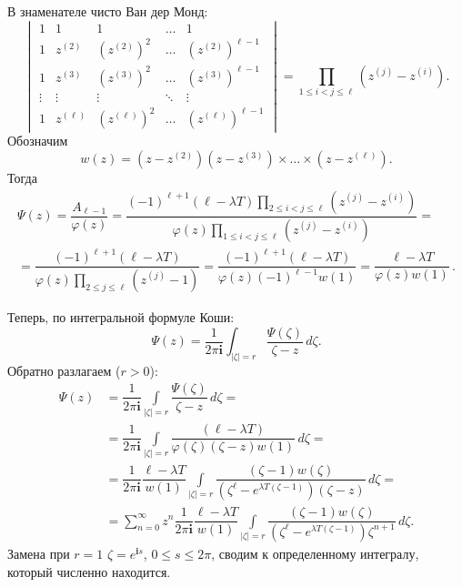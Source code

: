 \documentclass[10pt,oneside,final]{book}
\begin{document}
В знаменателе чисто Ван дер Монд:
\[
  \begin{vmatrix}
    1 & 1 & 1 & \ldots & 1 \\
    1 & z^{(2)} & (z^{(2)})^2 & \ldots & (z^{(2)})^{\ell-1}\\
    1 & z^{(3)} & (z^{(3)})^2 & \ldots & (z^{(3)})^{\ell-1}\\
    \vdots & \vdots & \vdots & \ddots & \vdots\\
    1 & z^{(\ell)} & (z^{(\ell)})^2 & \ldots & (z^{(\ell)})^{\ell-1}
  \end{vmatrix}=
  \prod_{1\leqslant i<j\leqslant \ell} (z^{(j)}-z^{(i)}).
\]
Обозначим 
\[
w(z)=(z-z^{(2)})(z-z^{(3)})\times\ldots\times (z-z^{(\ell)}).
\]
Тогда
\begin{multline*}
\Psi(z)=\dfrac{A_{\ell-1}}{\varphi(z)}=
\dfrac{(-1)^{\ell+1}(\ell-\lambda T) \prod\limits_{2\leqslant i<j\leqslant \ell}
  (z^{(j)}-z^{(i)})}{\varphi(z)\prod\limits_{1\leqslant i<j\leqslant \ell} (z^{(j)}-z^{(i)})}=
\\ =
\dfrac{(-1)^{\ell+1}(\ell-\lambda T)}{\varphi(z)\prod\limits_{2\leqslant j\leqslant \ell} (z^{(j)}-1)}
=
\dfrac{(-1)^{\ell+1}(\ell-\lambda T)}{\varphi(z)(-1)^{\ell-1} w(1)}=
\dfrac{\ell-\lambda T}{\varphi(z)w(1)}\,.
\end{multline*}


Теперь, по интегральной формуле Коши:
\[
\Psi(z)=\dfrac{1}{2\pi \mathbf i} \int_{|\zeta|=r} \dfrac{\Psi(\zeta)}{\zeta-z}\, d\zeta.
\]
Обратно разлагаем ($r>0$):
\begin{align*}
  \Psi(z)&=\dfrac{1}{2\pi \mathbf i} \int\limits_{|\zeta|=r} \dfrac{\Psi(\zeta)}{\zeta-z}\, d\zeta=
  \\ &=
  \dfrac{1}{2\pi \mathbf i} \int\limits_{|\zeta|=r} 
  \dfrac{(\ell-\lambda T)}{\varphi(\zeta)(\zeta-z)w(1)}\, d\zeta=
  \\ &=
  \dfrac{1}{2\pi \mathbf i} \dfrac{\ell-\lambda T}{w(1)}
  \int\limits_{|\zeta|=r} 
  \dfrac{(\zeta-1)w(\zeta)}{(\zeta^\ell-e^{\lambda T(\zeta-1)})(\zeta-z)}\,
  d\zeta=
  \\ & =
  \sum_{n=0}^\infty z^n   \dfrac{1}{2\pi \mathbf i} \dfrac{\ell-\lambda T}{w(1)}
  \int\limits_{|\zeta|=r} 
  \dfrac{(\zeta-1)w(\zeta)}{(\zeta^\ell-e^{\lambda T(\zeta-1)})\zeta^{n+1}}\,
  d\zeta.
\end{align*}
Замена  при $r=1$ $\zeta=e^{\mathbf i s}$, $0\leqslant s\leqslant 2\pi$, сводим к определенному интегралу,
который численно находится. 
\end{document}

